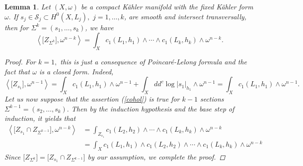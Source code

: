 \documentclass[11pt,leqno,oneside]{amsart}
\newtheorem{lem}[thm]{Lemma}
\numberwithin{equation}{section}
\begin{document}
\begin{lem}\label{coh_lemma}
	Let $(X,\omega)$ be a compact K\"{a}hler manifold with the fixed K\"{a}hler form $\omega.$ If $s_{j} \in \mathcal{S}_{j} \subset H^{0}(X, L_{j}), \,\,j=1, \ldots, k$, are smooth and intersect transversally, then for $\Sigma^{k}=(s_1, \ldots, s_k)$, we have
	\begin{equation}\label{cohol}
		\left \langle \big[Z_{\Sigma^{k}}\big], \omega^{n-k} \right \rangle = \int_{X}c_{1}(L_{1}, h_{1})\wedge \cdots \wedge c_{1}(L_{k}, h_{k}) \wedge \omega^{n-k}.
	\end{equation}
	\begin{proof}
		For $k=1,$ this is just a consequence of Poincar\'{e}-Lelong formula and the fact that $\omega$ is a closed form. Indeed,
		\begin{equation*}
			\left \langle \big[Z_{s_{1}}\big], \omega^{n-1} \right \rangle = \int_{X}c_{1}(L_{1}, h_{1})\wedge \omega^{n-1}+\int_{X} dd^{c}\log |s_{1}|_{h_{1}}\wedge\omega^{n-1}=\int_{X}c_{1}(L_{1}, h_{1})\wedge \omega^{n-1}.
		\end{equation*}
		Let us now suppose that the assertion (\ref{cohol}) is true for $k-1$ sections $\Sigma^{k-1}=(s_{2},\ldots, s_{k}).$ Then by the induction hypothesis and the base  step of induction,  it yields that
		\begin{align*}
				 \left \langle \big[Z_{s_{1}}\cap Z_{\Sigma^{k-1}}\big], \omega^{n-k} \right \rangle &= \int_{Z_{s_{1}}}c_{1}(L_{2}, h_{2})\wedge \cdots \wedge c_{1}(L_{k}, h_{k}) \wedge \omega^{n-k}\\
			&=\int_{X} c_{1}(L_{1}, h_{1}) \wedge c_{1}(L_{2}, h_{2})\wedge \cdots \wedge c_{1}(L_{k}, h_{k}) \wedge\omega^{n-k} \end{align*}
	Since $\big[Z_{\Sigma^{k}}\big]= \big[Z_{s_{1}}\cap Z_{\Sigma^{k-1}}\big]$ by our assumption, we complete the proof.	\end{proof}
\end{lem}

\vspace{1mm}
\end{document}
